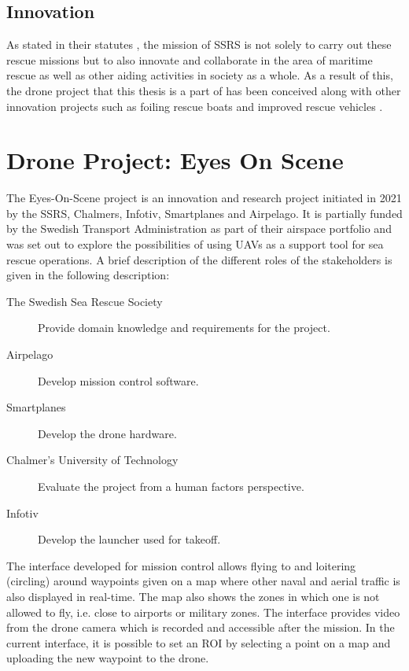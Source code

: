 \documentclass[nofilelist]{cslthse-msc}
\begin{document}
\subsection{Innovation}
As stated in their statutes \cite{ssrs-statues}, the mission of SSRS is not solely to carry out these rescue missions but to also innovate and collaborate in the area of maritime rescue as well as other aiding activities in society as a whole. As a result of this, the drone project that this thesis is a part of has been conceived along with other innovation projects such as foiling rescue boats and improved rescue vehicles \cite{surtsey-innovation}.

\section{Drone Project: Eyes On Scene}
The Eyes-On-Scene project is an innovation and research project initiated in 2021 by the SSRS, Chalmers, Infotiv, Smartplanes and Airpelago. It is partially funded by the Swedish Transport Administration as part of their airspace portfolio and was set out to explore the possibilities of using UAVs as a support tool for sea rescue operations. A brief description of the different roles of the stakeholders is given in the following description:

\begin{description}
   \item[The Swedish Sea Rescue Society] Provide domain knowledge and requirements for the project. 
   \item[Airpelago] Develop mission control software.
   \item[Smartplanes] Develop the drone hardware.
   \item[Chalmer's University of Technology] Evaluate the project from a human factors perspective.
   \item[Infotiv] Develop the launcher used for takeoff.
\end{description}

The interface developed for mission control allows flying to and loitering (circling) around waypoints given on a map where other naval and aerial traffic is also displayed in real-time. The map also shows the zones in which one is not allowed to fly, i.e. close to airports or military zones. The interface provides video from the drone camera which is recorded and accessible after the mission. In the current interface, it is possible to set an ROI by selecting a point on a map and uploading the new waypoint to the drone.
\end{document}
